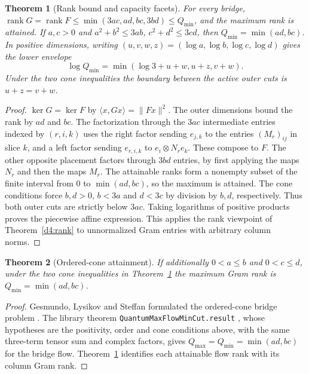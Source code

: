 \documentclass[11pt,reqno]{amsart}
\newtheorem{theorem}{Theorem}[section]
\theoremstyle{definition}
\theoremstyle{remark}
\numberwithin{equation}{section}
\begin{document}
\begin{theorem}[Rank bound and capacity facets]\label{m11:bridge-bound}
For every bridge, $\operatorname{rank}G=\operatorname{rank}F\le
\min(3ac,ad,bc,3bd)\le Q_{\min}$, and the maximum rank is attained. If
$a,c>0$ and $a^2+b^2\le3ab$, $c^2+d^2\le3cd$, then $Q_{\min}=\min(ad,bc)$.
In positive dimensions, writing $(u,v,w,z)=(\log a,\log b,\log c,\log d)$
gives the lower envelope
\[
 \log Q_{\min}=\min(\log3+u+w,u+z,v+w).
\]
Under the two cone inequalities the boundary between the active
outer cuts is $u+z=v+w$.
\end{theorem}
\begin{proof}
$\ker G=\ker F$ by $\langle x,Gx\rangle=\|Fx\|^2$.
The outer dimensions bound the rank by $ad$ and $bc$.
The factorization through the $3ac$ intermediate entries
indexed by $(r,i,k)$ uses the right factor sending $e_{j,k}$
to the entries $(M_r)_{ij}$ in slice $k$, and a left factor sending
$e_{r,i,k}$ to $e_i\otimes N_re_k$. These compose to $F$.
The other opposite placement factors through $3bd$ entries,
by first applying the maps $N_r$ and then the maps $M_r$.
The attainable ranks form a nonempty subset of the finite interval
from $0$ to $\min(ad,bc)$, so the maximum is attained. The cone conditions
force $b,d>0$, $b<3a$ and $d<3c$ by division by $b,d$, respectively.
Thus both outer cuts are strictly below $3ac$. Taking logarithms
of positive products proves the piecewise affine expression.
This applies the rank viewpoint of Theorem~\ref{d4:rank} to
unnormalized Gram entries with arbitrary column norms.
\end{proof}

\begin{theorem}[Ordered-cone attainment]\label{m11:cone-rank}
If additionally $0<a\le b$ and $0<c\le d$, under the two cone
inequalities in Theorem~\ref{m11:bridge-bound} the maximum Gram rank
is $Q_{\min}=\min(ad,bc)$.
\end{theorem}
\begin{proof}
Gesmundo, Lysikov and Steffan formulated the ordered-cone bridge
problem \cite[Conjecture~3.15]{m11:GLS}. The library theorem
\texttt{QuantumMaxFlowMinCut.result} \cite{Tru}, whose hypotheses are
the positivity, order and cone conditions above, with the same
three-term tensor sum and complex factors, gives
$Q_{\max}=Q_{\min}=\min(ad,bc)$ for the bridge flow.
Theorem~\ref{m11:bridge-bound} identifies each attainable flow rank
with its column Gram rank.
\end{proof}
\end{document}
